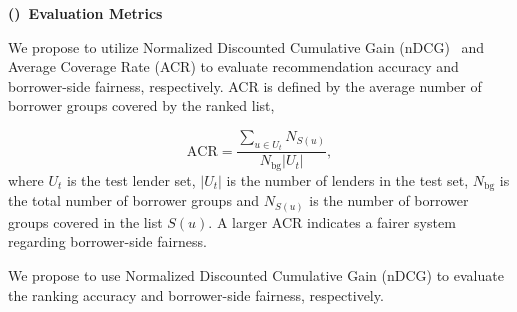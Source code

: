 \vspace{0.25cm}
\noindent \textbf{()~Evaluation Metrics}
\vspace{0.25cm}

We propose to utilize Normalized Discounted Cumulative Gain (nDCG)~\cite{jarvelin2002cumulated} and Average Coverage Rate (ACR) to evaluate recommendation accuracy and borrower-side fairness, respectively. ACR is defined by the average number of borrower groups covered by the ranked list,


\begin{equation}
    \text{ACR}=\frac{\sum_{u\in U_t}N_{S(u)}}{N_\text{bg}|U_t|},
\end{equation}
where $U_t$ is the test lender set, $|U_t|$ is the number of lenders in the test set, $N_\text{bg}$ is the total number of borrower groups and $N_{S(u)}$ is the number of borrower groups covered in the list $S(u)$. A larger ACR indicates a fairer system regarding borrower-side fairness.

We propose to use Normalized Discounted Cumulative Gain (nDCG) to evaluate the ranking accuracy and borrower-side fairness, respectively.


